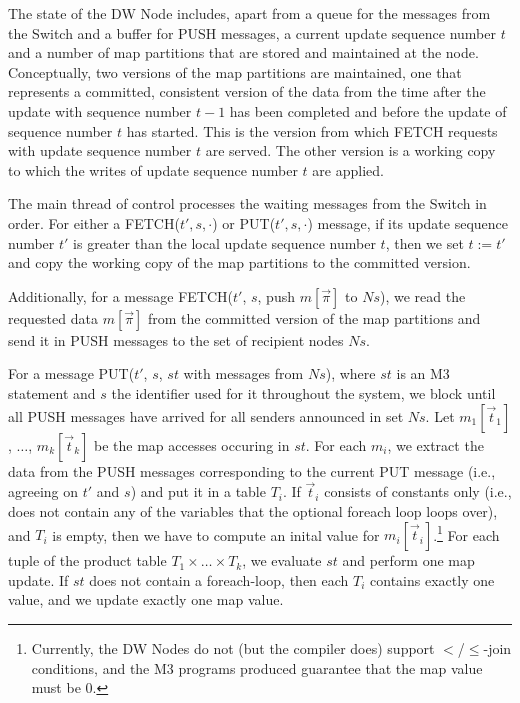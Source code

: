 
The state of the DW Node includes, apart from a queue 
for the messages from the Switch and a buffer for PUSH messages, a
current update sequence number $t$ and a number
of map partitions that are stored and maintained at the node.
Conceptually, two versions of the map partitions are maintained,
one that represents a committed, consistent version of the data from the time after the
update with sequence number $t-1$ has been completed and before the update
of sequence number $t$ has started. This is the version from which FETCH
requests with update sequence number $t$ are served. The other
version is a working copy to which the writes of update sequence number
$t$ are applied.

The main thread of control processes the waiting messages from the Switch
in order.
For either a FETCH($t', s, \cdot$) or PUT($t', s,\cdot$) message, if its
update sequence number $t'$ is greater
than the local update sequence number $t$, then we set $t := t'$
and copy the working copy of the map partitions to the committed version.

Additionally,
for a message FETCH($t'$, $s$, push $m[\vec{\pi}]$ to $\textit{Ns}$),
we read the requested data $m[\vec{\pi}]$ from the committed version of
the map partitions and send it in PUSH messages to the set of recipient
nodes $\textit{Ns}$.

For a message PUT($t'$, $s$, $st$ with messages from $\textit{Ns}$), where $st$
is an M3 statement and $s$ the identifier used for it throughout the 
system, we block until all PUSH messages have arrived for all
senders announced in set $\textit{Ns}$.
Let $m_1[\vec{t}_1]$, $\dots$, $m_k[\vec{t}_k]$ be the map accesses occuring in
$st$. For each $m_i$, 
we extract the data from the PUSH messages corresponding
to the current PUT message (i.e., agreeing on $t'$ and $s$) and put it in a table $T_i$.
If $\vec{t}_i$ consists of constants only (i.e., does not contain any
of the variables that the optional foreach loop loops over), and $T_i$ is
empty, then we have to compute an inital value for
$m_i[\vec{t}_i]$.\footnote{Currently,
the DW Nodes do not (but the compiler does) support $<$/$\le$-join conditions,
and the M3 programs produced guarantee that the map value must be 0.}
For each tuple of the product table $T_1 \times \dots \times T_k$,
we evaluate $st$ and perform one map update.
If $st$ does not contain a foreach-loop, then each $T_i$ contains exactly
one value, and we update exactly one map value.


